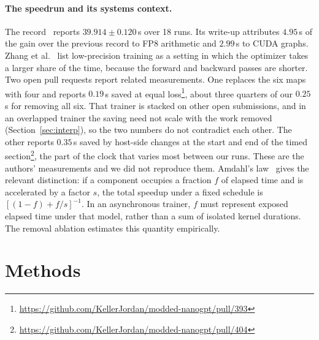 \documentclass{article}
\begin{document}
\paragraph{The speedrun and its systems context.} The record~\cite{anvil2} reports $39.914\pm0.120$\,s over 18 runs. Its write-up attributes $4.95$\,s of the gain over the previous record to FP8 arithmetic and $2.99$\,s to CUDA graphs. Zhang et al.~\cite{gramns} list low-precision training as a setting in which the optimizer takes a larger share of the time, because the forward and backward passes are shorter. Two open pull requests report related measurements. One replaces the six maps with four and reports $0.19$\,s saved at equal loss\footnote{\url{https://github.com/KellerJordan/modded-nanogpt/pull/393}}, about three quarters of our $0.25$\,s for removing all six. That trainer is stacked on other open submissions, and in an overlapped trainer the saving need not scale with the work removed (Section~\ref{sec:interp}), so the two numbers do not contradict each other. The other reports $0.35$\,s saved by host-side changes at the start and end of the timed section\footnote{\url{https://github.com/KellerJordan/modded-nanogpt/pull/404}}, the part of the clock that varies most between our runs. These are the authors' measurements and we did not reproduce them. Amdahl's law~\cite{amdahl} gives the relevant distinction: if a component occupies a fraction $f$ of elapsed time and is accelerated by a factor $s$, the total speedup under a fixed schedule is $[(1-f)+f/s]^{-1}$. In an asynchronous trainer, $f$ must represent exposed elapsed time under that model, rather than a sum of isolated kernel durations. The removal ablation estimates this quantity empirically.

\section{Methods}\label{sec:method}
\end{document}

